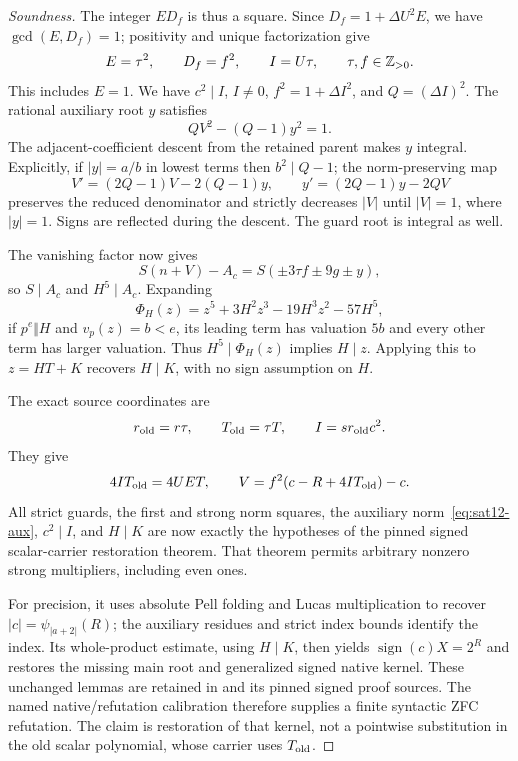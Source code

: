 \begin{proof}[Soundness]
The integer $ED_f$ is thus a square.  Since
$D_f=1+\Delta U^2E$, we have $\gcd(E,D_f)=1$; positivity and unique
factorization give
\[
 E=\tau^2,\qquad D_f=f^2,\qquad I=U\tau,
 \qquad \tau,f\in\mathbb Z_{>0}.
\]
This includes $E=1$.  We have $c^2\mid I$, $I\ne0$,
$f^2=1+\Delta I^2$, and $Q=(\Delta I)^2$.
The rational auxiliary root $y$ satisfies
\begin{equation}
 QV^2-(Q-1)y^2=1.
 \label{eq:sat12-aux}
\end{equation}
The adjacent-coefficient descent from the retained parent makes $y$
integral.  Explicitly, if $|y|=a/b$ in lowest terms then $b^2\mid Q-1$;
the norm-preserving map
\[
 V'=(2Q-1)V-2(Q-1)y,\qquad y'=(2Q-1)y-2QV
\]
preserves the reduced denominator and strictly decreases $|V|$ until
$|V|=1$, where $|y|=1$.  Signs are reflected during the descent.
The guard root is integral as well.

The vanishing factor now gives
\[
 S(n+V)-A_c=S(\pm3\tau f\pm9g\pm y),
\]
so $S\mid A_c$ and $H^5\mid A_c$.  Expanding
\[
 \Phi_H(z)=z^5+3H^2z^3-19H^3z^2-57H^5,
\]
if $p^e\Vert H$ and $v_p(z)=b<e$, its leading term has valuation
$5b$ and every other term has larger valuation.  Thus
$H^5\mid\Phi_H(z)$ implies $H\mid z$.  Applying this to $z=HT+K$
recovers $H\mid K$, with no sign assumption on $H$.

The exact source coordinates are
\begin{equation}
 r_{\rm old}=r\tau,\qquad T_{\rm old}=\tau T,
 \qquad I=sr_{\rm old}c^2.
 \label{eq:sat12-restoration}
\end{equation}
They give
\[
 4IT_{\rm old}=4UE T,\qquad
 V=f^2(c-R+4IT_{\rm old})-c.
\]
All strict guards, the first and strong norm squares,
the auxiliary norm~\eqref{eq:sat12-aux}, $c^2\mid I$, and $H\mid K$
are now exactly the hypotheses of the pinned signed scalar-carrier
restoration theorem.  That theorem permits arbitrary nonzero strong
multipliers, including even ones.

For precision, it uses absolute Pell folding and Lucas multiplication
to recover $|c|=\psi_{|a+2|}(R)$; the auxiliary residues and strict
index bounds identify the index.  Its whole-product estimate, using
$H\mid K$, then yields $\operatorname{sign}(c)X=2^R$ and restores
the missing main root and generalized signed native kernel.  These
unchanged lemmas are retained in 
and its pinned signed proof sources.  The named native/refutation
calibration therefore supplies a finite syntactic ZFC refutation.
The claim is restoration of that kernel, not a pointwise substitution
in the old scalar polynomial, whose carrier uses $T_{\rm old}$.
\end{proof}

